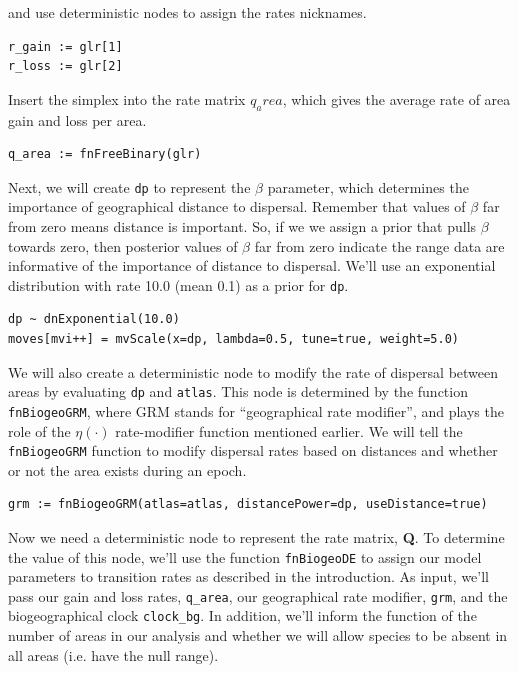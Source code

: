 and use deterministic nodes to assign the rates nicknames.

\begin{snugshade}
\begin{lstlisting}
r_gain := glr[1]
r_loss := glr[2]
\end{lstlisting}
\end{snugshade}

Insert the simplex into the rate matrix {\tt $q_area$}, which gives the average rate of area gain and loss per area.

\begin{snugshade}
\begin{lstlisting}
q_area := fnFreeBinary(glr)
\end{lstlisting}
\end{snugshade}

Next, we will create {\tt dp} to represent the $\beta$ parameter, which determines the importance of geographical distance to dispersal.
Remember that values of $\beta$ far from zero means distance is important.
So, if we we assign a prior that pulls $\beta$ towards zero, then posterior values of $\beta$ far from zero indicate the range data are informative of the importance of distance to dispersal.
We'll use an exponential distribution with rate 10.0 (mean 0.1) as a prior for {\tt dp}.

\begin{snugshade}
\begin{lstlisting}
dp ~ dnExponential(10.0)
moves[mvi++] = mvScale(x=dp, lambda=0.5, tune=true, weight=5.0)
\end{lstlisting}
\end{snugshade}

We will also create a deterministic node to modify the rate of dispersal between areas by evaluating {\tt dp} and {\tt atlas}.
This node is determined by the function {\tt fnBiogeoGRM}, where GRM stands for ``geographical rate modifier'', and plays the role of the $\eta(\cdot)$ rate-modifier function mentioned earlier.
We will tell the {\tt fnBiogeoGRM} function to modify dispersal rates based on distances and whether or not the area exists during an epoch.

\begin{snugshade}
\begin{lstlisting}
grm := fnBiogeoGRM(atlas=atlas, distancePower=dp, useDistance=true)
\end{lstlisting}
\end{snugshade}

Now we need a deterministic node to represent the rate matrix, {\bf Q}.
To determine the value of this node, we'll use the function {\tt fnBiogeoDE} to assign our model parameters to transition rates as described in the introduction.
As input, we'll pass our gain and loss rates, {\tt q\_area}, our geographical rate modifier, {\tt grm}, and the biogeographical clock {\tt clock\_bg}.
In addition, we'll inform the function of the number of areas in our analysis and whether we will allow species to be absent in all areas (i.e. have the null range).

